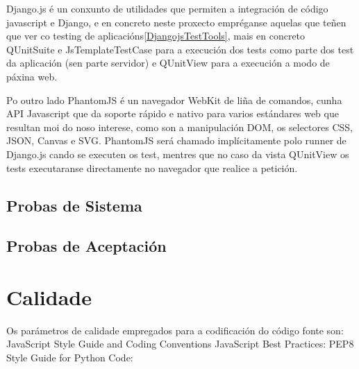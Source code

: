         Django.js é un conxunto de utilidades que permiten a integración de código javascript e 
        Django, e en concreto neste proxecto empréganse aquelas que teñen que ver co testing de
        aplicacións\ref{DjangojsTestTools}, mais en concreto QUnitSuite e JsTemplateTestCase para a
        execución dos tests como parte dos test da aplicación (sen parte servidor) e QUnitView 
        para a execución a modo de páxina web.
        
        Po outro lado PhantomJS é un navegador WebKit de liña de comandos, cunha API Javascript que
        da soporte rápido e nativo para varios estándares web que resultan moi do noso interese,
        como son a manipulación DOM, os selectores CSS, JSON, Canvas e SVG. PhantomJS será chamado
        implícitamente polo runner de Django.js cando se executen os test, mentres que no caso da 
        vista QUnitView os tests executaranse directamente no navegador que realice a petición.

\section{Probas de Sistema}

\section{Probas de Aceptación}

\chapter{Calidade}
	Os parámetros de calidade empregados para a codificación do código fonte son:
		JavaScript Style Guide and Coding Conventions\cite{javascript-style-guide}
		JavaScript Best Practices:\cite{javascript-best-practices}
		PEP8 Style Guide for Python Code: \cite{pepe8-style-guide}